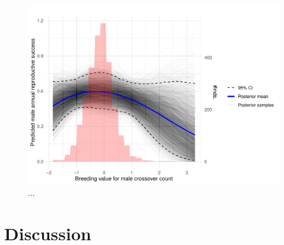 \documentclass[dvipsnames]{article}
\begin{document}
\begin{figure}
    \centering
    \includegraphics[width=0.91\linewidth]{figs/ars_bv_pred_m.pdf}
    \caption{...}
    \label{fig-ars_bv_m}
\end{figure}

\section*{Discussion}

\clearpage



\clearpage
\end{document}
